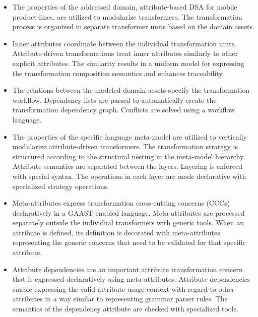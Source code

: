 \begin{itemize}

\item The properties of the addressed domain, attribute-based DSA for mobile product-lines, are utilized to modularize transformers. The transformation process is organized in separate transformer units based on the domain assets.

\item Inner attributes coordinate between the individual transformation units. Attribute-driven transformations treat inner attributes similarly to other explicit attributes. The similarity results in a uniform model for expressing the transformation composition semantics and enhances traceability.

\item The relations between the modeled domain assets specify the transformation workflow. Dependency lists are parsed to automatically create the transformation dependency graph. Conflicts are solved using a workflow language.

\item The properties of the specific language meta-model are utilized to vertically modularize attribute-driven transformers. The transformation strategy is structured according to the structural nesting in the meta-model hierarchy. Attribute semantics are separated between the layers. Layering is enforced with special syntax. The operations in each layer are made declarative with specialized strategy operations.

\item Meta-attributes express transformation cross-cutting concerns (CCCs) declaratively in a GAAST-enabled language. Meta-attributes are processed separately outside the individual transformers with generic tools. When an attribute is defined, its definition is decorated with meta-attributes representing the generic concerns that need to be validated for that specific attribute.

\item Attribute dependencies are an important attribute transformation concern that is expressed declaratively using meta-attributes. Attribute dependencies enable expressing the valid attribute usage context with regard to other attributes in a way similar to representing grammar parser rules. The semantics of the dependency attribute are checked with specialized tools.

\end{itemize}

